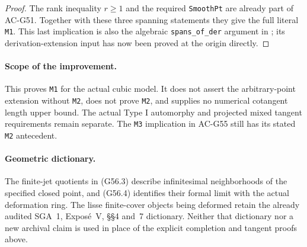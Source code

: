 \begin{proof}
The rank inequality $r\geq1$ and the required
\texttt{SmoothPt} are already part of AC-G51.
Together with these three spanning statements
they give the full literal \texttt{M1}.
This last implication is also the algebraic
\texttt{spans\_of\_der} argument in
;
its derivation-extension input has now been
proved at the origin directly.
\end{proof}

\paragraph{Scope of the improvement.}
This proves \texttt{M1} for the actual cubic model.
It does not assert the arbitrary-point extension
without \texttt{M2}, does not prove \texttt{M2},
and supplies no numerical cotangent length upper
bound.  The actual Type I automorphy and projected
mixed tangent requirements remain separate.
The \texttt{M3} implication in AC-G55 still has
its stated \texttt{M2} antecedent.

\paragraph{Geometric dictionary.}
The finite-jet quotients in (G56.3) describe
infinitesimal neighborhoods of the specified
closed point, and (G56.4) identifies their
formal limit with the actual deformation ring.
The lisse finite-cover objects being deformed
retain the already audited SGA~1, Expos\'e~V,
\S\S4 and~7 dictionary.  Neither that dictionary
nor a new archival claim is used in place of
the explicit completion and tangent proofs above.
